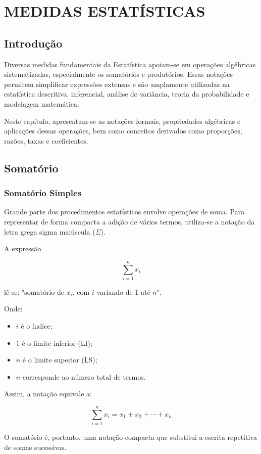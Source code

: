 \chapter{MEDIDAS ESTATÍSTICAS}
\section{Introdução}

Diversas medidas fundamentais da Estatística apoiam-se em operações algébricas sistematizadas, especialmente os somatórios e produtórios. Essas notações permitem simplificar expressões extensas e são amplamente utilizadas na estatística descritiva, inferencial, análise de variância, teoria da probabilidade e modelagem matemática. \vskip0.3cm

Neste capítulo, apresentam-se as notações formais, propriedades algébricas e aplicações dessas operações, bem como conceitos derivados como proporções, razões, taxas e coeficientes.

\section{Somatório}
\subsection{Somatório Simples}

Grande parte dos procedimentos estatísticos envolve operações de soma. Para representar de forma compacta a adição de vários termos, utiliza-se a notação da letra grega sigma maiúscula ($\Sigma$).  \vskip0.3cm

A expressão

\[
\sum_{i=1}^{n} x_i
\]

lê-se: "somatório de $x_i$, com $i$ variando de 1 até $n$". 

\newpage
Onde:

\begin{itemize}
\item $i$ é o índice;
\item $1$ é o limite inferior (LI);
\item $n$ é o limite superior (LS);
\item $n$ corresponde ao número total de termos.
\end{itemize}

Assim, a notação equivale a:

\[
\sum_{i=1}^{n} x_i = x_1 + x_2 + \cdots + x_n
\]

O somatório é, portanto, uma notação compacta que substitui a escrita repetitiva de somas sucessivas.

